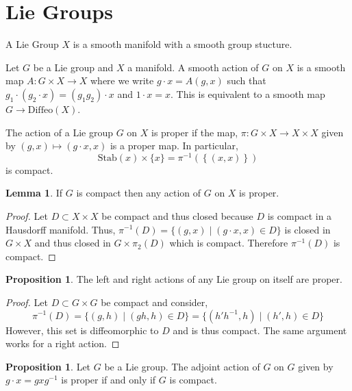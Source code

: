 \documentclass[12pt]{extarticle}
\theoremstyle{definition}
\newtheorem{lemma}[theorem]{Lemma}
\newtheorem{proposition}[theorem]{Proposition}
\newenvironment{definition}[1][Definition:]{\begin{trivlist}
\item[\hskip \labelsep {\bfseries #1}]}{\end{trivlist}}
\begin{document}
\section{Lie Groups} 

\begin{definition}
A Lie Group $X$ is a smooth manifold with a smooth group stucture.
\end{definition}

\begin{definition}
Let $G$ be a Lie group and $X$ a manifold. A smooth action of $G$ on $X$ is a smooth map $A : G \times X \to X$ where we write $g \cdot x = A(g, x)$ such that $g_1 \cdot (g_2 \cdot x) = (g_1 g_2) \cdot x$ and $1 \cdot x = x$. This is equivalent to a smooth map $G \to \mathrm{Diffeo}(X)$. 
\end{definition}

\begin{definition}
The action of a Lie group $G$ on $X$ is proper if the map, $\pi : G \times X \to X \times X$ given by $(g, x) \mapsto (g \cdot x, x)$ is a proper map. In particular, \[ \mathrm{Stab}(x) \times \{x\} = \pi^{-1}(\left\{(x,x)\right\})\]
is compact. 
\end{definition}

\begin{lemma}
If $G$ is compact then any action of $G$ on $X$ is proper.
\end{lemma}

\begin{proof}
Let $D \subset X \times X$ be compact and thus closed because $D$ is compact in a Hausdorff manifold. Thus, $\pi^{-1}(D) = \{ (g, x) \mid (g \cdot x, x) \in D \}$ is closed in $G \times X$ and thus closed in $G \times \pi_2(D)$ which is compact. Therefore $\pi^{-1}(D)$ is compact. 
\end{proof}

\begin{proposition} \label{proper_self_actions}
The left and right actions of any Lie group on itself are proper.
\end{proposition}

\begin{proof}
Let $D \subset G \times G$ be compact and consider,
\[ \pi^{-1}(D) = \{ (g, h) \mid (g h, h) \in D \} = \{ (h' h^{-1}, h) \mid (h', h) \in D \}\]
However, this set is diffeomorphic to $D$ and is thus compact. The same argument works for a right action.
\end{proof}

\begin{proposition}
Let $G$ be a Lie group. The adjoint action of $G$ on $G$ given by $g \cdot x = gxg^{-1}$ is proper if and only if $G$ is compact.
\end{proposition}
\end{document}
